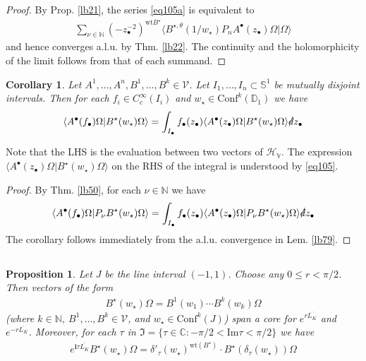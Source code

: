 \documentclass[12pt,b5paper,notitlepage]{article}
\theoremstyle{definition}
\theoremstyle{plain}
\newtheorem{pp}[df]{Proposition}
\newtheorem{co}[df]{Corollary}
\newcommand{\fk}{\mathfrak}
\newcommand{\ovl}{\overline}
\newcommand{\Conf}{\mathrm{Conf}}
\newcommand{\bk}[1]{\langle {#1}\rangle}
\newcommand{\im}{\mathbf{i}}
\newcommand{\blt}{\bullet}
\newcommand{\Cbb}{\mathbb C}
\newcommand{\Nbb}{\mathbb N}
\newcommand{\Dbb}{\mathbb D}
\newcommand{\wt}{\mathrm{wt}}
\newcommand{\Sbb}{{\mathbb S}}
\newcommand{\Imag}{\mathrm{Im}}
\newcommand{\HV}{\mathcal H_{\mathbb V}}
\newcommand{\sd}{\slashed{d}}
\newcommand{\MV}{\mathcal V}
\numberwithin{equation}{section}
\begin{document}
\begin{proof}
By Prop. \ref{lb21}, the series \eqref{eq105a} is equivalent to
\begin{align*}
\sum_{\nu\in\Nbb}(-z_\blt^{-2})^{\wt B^\star}\bk{B^{\star,\theta}(1/w_\star)P_nA^\blt(z_\blt)\Omega|\Omega}
\end{align*}
and hence converges a.l.u. by Thm. \ref{lb22}. The continuity and the holomorphicity of the limit follows from that of each summand.
\end{proof}








\begin{co}\label{lb82}
Let $A^1,\dots,A^n,B^1,\dots,B^k\in\MV$. Let $I_1,\dots,I_n\subset\Sbb^1$ be mutually disjoint intervals. Then  for each $f_i\in C_c^\infty(I_i)$ and $w_\star\in\Conf^k(\Dbb_1)$ we have
\begin{align}
\bk{A^\blt(f_\blt)\Omega|B^\star(w_\star)\Omega}=\int_{I_\blt} f_\blt(z_\blt)\bk{A^\blt(z_\blt)\Omega|B^\star(w_\star)\Omega}\sd z_\blt
\end{align}
\end{co}

Note that the LHS is the evaluation between two vectors of $\HV$. The expression $\bk{A^\blt(z_\blt)\Omega|B^\star(w_\star)\Omega}$ on the RHS of the integral is understood by \eqref{eq105}.

\begin{proof}
By Thm. \ref{lb50}, for each $\nu\in\Nbb$ we have
\begin{align*}
\bk{A^\blt(f_\blt)\Omega|P_\nu B^\star(w_\star)\Omega}=\int_{I_\blt} f_\blt(z_\blt)\bk{A^\blt(z_\blt)\Omega|P_\nu B^\star(w_\star)\Omega}\sd z_\blt
\end{align*}
The corollary follows immediately from the a.l.u. convergence in Lem. \ref{lb79}.
\end{proof}


\subsection{}




\begin{pp}\label{lb83}
Let $J$ be the line interval $(-1,1)$. Choose any $0\leq r<\pi/2$. Then vectors of the form
\begin{align}\label{eq106}
B^\star(w_\star)\Omega=B^1(w_1)\cdots B^k(w_k)\Omega
\end{align}
(where $k\in\Nbb$, $B^1,\dots,B^k\in\MV$, and $w_\star\in\Conf^k(J)$) span a core for $e^{r{\ovl{L_K}}}$ and $e^{-r{\ovl{L_K}}}$. Moreover, for each $\tau$ in $\fk I=\{\tau\in\Cbb: -\pi/2<\Imag\tau < \pi/2 \}$ we have
\begin{align}\label{eq107}
e^{\im \tau\ovl{L_K}}B^\star(w_\star)\Omega=\delta'_\tau(w_\star)^{\wt(B^\star)}\cdot B^\star(\delta_\tau(w_\star))\Omega
\end{align}
\end{pp}
\end{document}
